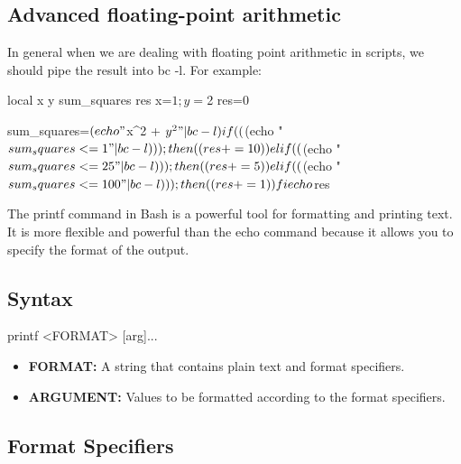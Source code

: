 \documentclass{report}
\begin{document}
    \bigbreak \noindent 
    \subsection{Advanced floating-point arithmetic}
    \bigbreak \noindent 
    In general when we are dealing with floating point arithmetic in scripts, we should pipe the result into bc -l. 
    \bigbreak \noindent 
    For example:
    \bigbreak \noindent 
    \begin{bashcode}
    local x y sum_squares res
    x=$1;y=$2
    res=0

    sum_squares=$(echo "$x^2 + $y^2" | bc -l)

    if (( $(echo "$sum_squares <= 1" | bc -l)  )); then 
        (( res+=10 ))
    elif (( $(echo "$sum_squares <= 25"  | bc -l) )); then
        (( res+= 5 ))
    elif (( $(echo "$sum_squares <= 100" | bc -l) )); then
        (( res+= 1 ))
    fi

    echo $res
    \end{bashcode}

    \pagebreak 
    \bigbreak \noindent 
    The printf command in Bash is a powerful tool for formatting and printing text. It is more flexible and powerful than the echo command because it allows you to specify the format of the output.
    \bigbreak \noindent 
    \subsection{Syntax}
    \bigbreak \noindent 
    \begin{bashcode}
        printf <FORMAT> [arg]...

    \end{bashcode}
    \begin{itemize}
        \item \textbf{FORMAT:} A string that contains plain text and format specifiers.
        \item \textbf{ARGUMENT:} Values to be formatted according to the format specifiers.
    \end{itemize}

    \bigbreak \noindent 
    \subsection{Format Specifiers}
\end{document}
